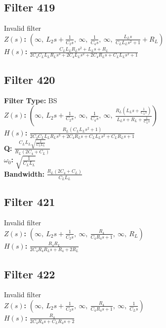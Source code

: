 \documentclass{article}
\begin{document}
\subsection*{Filter 419}
Invalid filter \\ 
\textbf{$Z(s)$:} $\left( \infty, \  L_{2} s + \frac{1}{C_{2} s}, \  \infty, \  \frac{1}{C_{4} s}, \  \infty, \  \frac{L_{L} s}{C_{L} L_{L} s^{2} + 1} + R_{L}\right)$ \\ 
\textbf{$H(s)$:} $\frac{C_{L} L_{L} R_{L} s^{2} + L_{L} s + R_{L}}{2 C_{4} C_{L} L_{L} R_{L} s^{3} + 2 C_{4} L_{L} s^{2} + 2 C_{4} R_{L} s + C_{L} L_{L} s^{2} + 1}$ \\ 
\subsection*{Filter 420}
\textbf{Filter Type:} BS \\ 
\textbf{$Z(s)$:} $\left( \infty, \  L_{2} s + \frac{1}{C_{2} s}, \  \infty, \  \frac{1}{C_{4} s}, \  \infty, \  \frac{R_{L} \left(L_{L} s + \frac{1}{C_{L} s}\right)}{L_{L} s + R_{L} + \frac{1}{C_{L} s}}\right)$ \\ 
\textbf{$H(s)$:} $\frac{R_{L} \left(C_{L} L_{L} s^{2} + 1\right)}{2 C_{4} C_{L} L_{L} R_{L} s^{3} + 2 C_{4} R_{L} s + C_{L} L_{L} s^{2} + C_{L} R_{L} s + 1}$ \\ 
\textbf{Q:} $\frac{C_{L} L_{L} \sqrt{\frac{1}{C_{L} L_{L}}}}{R_{L} \left(2 C_{4} + C_{L}\right)}$ \\ 
\textbf{$\omega_0$:} $\sqrt{\frac{1}{C_{L} L_{L}}}$ \\ 
\textbf{Bandwidth:} $\frac{R_{L} \left(2 C_{4} + C_{L}\right)}{C_{L} L_{L}}$ \\ 
\subsection*{Filter 421}
Invalid filter \\ 
\textbf{$Z(s)$:} $\left( \infty, \  L_{2} s + \frac{1}{C_{2} s}, \  \infty, \  \frac{R_{4}}{C_{4} R_{4} s + 1}, \  \infty, \  R_{L}\right)$ \\ 
\textbf{$H(s)$:} $\frac{R_{4} R_{L}}{2 C_{4} R_{4} R_{L} s + R_{4} + 2 R_{L}}$ \\ 
\subsection*{Filter 422}
Invalid filter \\ 
\textbf{$Z(s)$:} $\left( \infty, \  L_{2} s + \frac{1}{C_{2} s}, \  \infty, \  \frac{R_{4}}{C_{4} R_{4} s + 1}, \  \infty, \  \frac{1}{C_{L} s}\right)$ \\ 
\textbf{$H(s)$:} $\frac{R_{4}}{2 C_{4} R_{4} s + C_{L} R_{4} s + 2}$ \\ 
\end{document}

